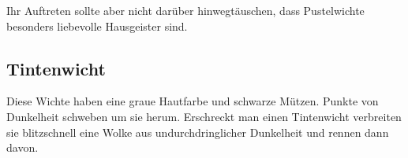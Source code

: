\documentclass[10pt,twoside,twocolumn,openany]{book}
\begin{document}
Ihr Auftreten sollte aber nicht darüber hinwegtäuschen, dass Pustelwichte besonders liebevolle Hausgeister sind.

\subsection{Tintenwicht} Diese Wichte haben eine graue Hautfarbe und schwarze Mützen. Punkte von Dunkelheit schweben um sie herum. Erschreckt man einen Tintenwicht verbreiten sie blitzschnell eine Wolke aus undurchdringlicher Dunkelheit und rennen dann davon.



%
%			
%		
%		
%		
\end{document}
